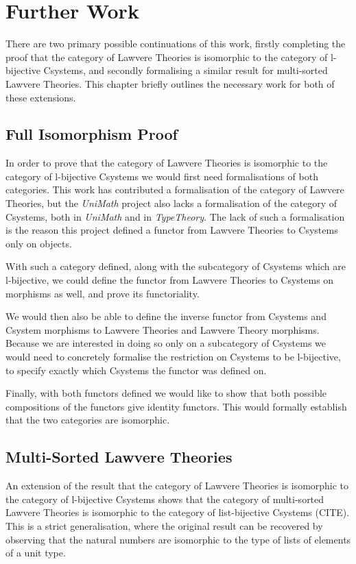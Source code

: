 \chapter{Further Work}
There are two primary possible continuations of this work, firstly completing
the proof that the category of Lawvere Theories is isomorphic to the category of
l-bijective Csystems, and secondly formalising a similar result for multi-sorted
Lawvere Theories. This chapter briefly outlines the necessary work for both of
these extensions.

\section{Full Isomorphism Proof}
In order to prove that the category of Lawvere Theories is isomorphic to the
category of l-bijective Csystems we would first need formalisations of both
categories. This work has contributed a formalisation of the category of Lawvere
Theories, but the \textit{UniMath} project also lacks a formalisation of the
category of Csystems, both in \textit{UniMath} and in \textit{TypeTheory}. The
lack of such a formalisation is the reason this project defined a functor from
Lawvere Theories to Csystems only on objects.

With such a category defined, along with the subcategory of Csystems which are
l\nobreakdash-bijective, we could define the functor from Lawvere Theories to Csystems on
morphisms as well, and prove its functoriality.

We would then also be able to define the inverse functor from Csystems and
Csystem morphisms to Lawvere Theories and Lawvere Theory morphisms. Because we
are interested in doing so only on a subcategory of Csystems we would need to
concretely formalise the restriction on Csystems to be l\nobreakdash-bijective,
to specify exactly which Csystems the functor was defined on.

Finally, with both functors defined we would like to show that both possible
compositions of the functors give identity functors. This would formally
establish that the two categories are isomorphic.

\section{Multi-Sorted Lawvere Theories}
An extension of the result that the category of Lawvere Theories is isomorphic
to the category of l-bijective Csystems shows that the category of multi-sorted
Lawvere Theories is isomorphic to the category of list-bijective Csystems
(CITE). This is a strict generalisation, where the original result can be
recovered by observing that the natural numbers are isomorphic to the type of
lists of elements of a unit type.